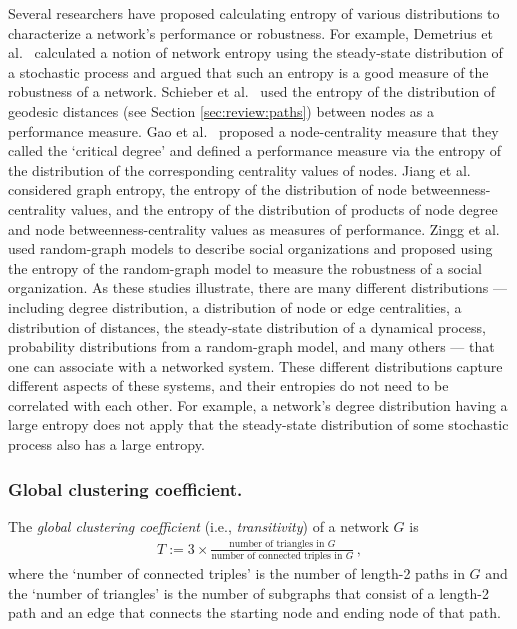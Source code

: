\documentclass{comnet-mod}
\begin{document}
Several researchers have proposed calculating entropy of various distributions to characterize a network's performance or robustness. For example, Demetrius et al.~\cite{Demetrius2005} calculated a notion of network entropy using the steady-state distribution of a stochastic process 
and argued that such an entropy is a good measure of the robustness of a network. 
Schieber et al.~\cite{Schieber2016} used the entropy of the distribution of geodesic distances (see Section \ref{sec:review:paths}) between nodes as a performance measure. Gao et al.~\cite{Gao2017} proposed a node-centrality measure that they called the `critical degree' and defined a performance measure via the entropy of the distribution of the corresponding centrality values of nodes. Jiang et al.~\cite{Jiang2019} considered graph entropy, the entropy of the distribution of node betweenness-centrality values, and the entropy of the distribution of products of node degree and node betweenness-centrality values as measures of performance. Zingg et al.~\cite{Zingg2019} used random-graph models to describe social organizations and proposed using the entropy of the random-graph model to measure the robustness of a social organization. As these studies illustrate, there are many different distributions --- including degree distribution, a distribution of node or edge centralities, a distribution of distances, the steady-state distribution of a dynamical process, probability distributions from a random-graph model, and many others --- that one can associate with a networked system. These different distributions capture different aspects of these systems, and their entropies do not need to be correlated with each other. For example, a network's degree distribution having a large entropy does not apply that the steady-state distribution of some stochastic process also has a large entropy.


\subsubsection{Global clustering coefficient.}

The \textit{global clustering coefficient} (i.e., \textit{transitivity}) of a network $G$ is \cite{Newman2018}
\begin{align}
	T := 3\times\frac{\textrm{number of triangles in $G$}}{\textrm{number of connected triples in $G$}}\,,\nonumber
\end{align}
where the `number of connected triples' is the number of length-2 paths in $G$ and the `number of triangles' is the number of subgraphs that consist of a length-2 path and an edge that connects the starting node and ending node of that path.
\end{document}
